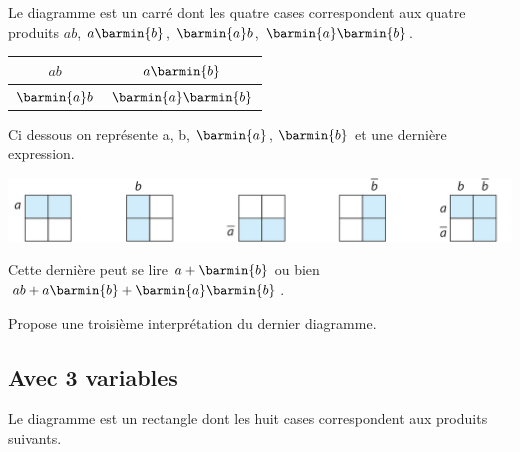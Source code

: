 \documentclass[a4paper,12pt,french]{book}
\begin{document}
Le diagramme est un carré dont les quatre cases correspondent aux quatre produits $ab$, $a\barmin{b}$, $\barmin{a}b$, $\barmin{a}\barmin{b}$.

\begin{center}
	\begin{tabular}{|c|c|}
		\hline
		$ab$ &  $a\barmin{b}$\\
		\hline
		$\barmin{a}b$ & $\barmin{a}\barmin{b}$\\
		\hline
	\end{tabular}
\end{center}
Ci dessous on représente a, b, $\barmin{a}$, $\barmin{b}$ et une dernière expression.
\begin{center}
	\includegraphics[width=15cm]{karnaugh1.png}
\end{center}

Cette dernière peut se lire $a+\barmin{b}$ ou bien $ab+a\barmin{b}+\barmin{a}\barmin{b}$.

\begin{exercice}[]
	Propose une troisième interprétation du dernier diagramme.
\end{exercice}

\subsection*{Avec 3 variables}

Le diagramme est un rectangle dont les huit cases correspondent aux produits suivants.
\end{document}
